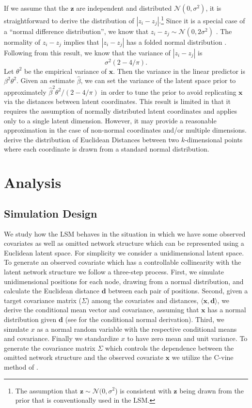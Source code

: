\documentclass[11pt]{article}
\begin{document}
If we assume that the $\mathbf{z}$ are independent and distributed $\mathcal{N}(0,\sigma^2)$, it is straightforward to derive the distribution of $|z_i - z_j|$.\footnote{The assumption that $\mathbf{z} \sim \mathcal{N}(0,\sigma^2$) is consistent with $\mathbf{z}$ being drawn from the prior that is conventionally used in the LSM.} Since it is a special case of a ``normal difference distribution'', we know that $z_i - z_j \sim \mathcal{N}(0,2\sigma^2)$ \citep{devore2012}. The normality of $z_i - z_j$ implies that $|z_i - z_j|$ has a folded normal distribution \citep{leone1961}. Following from this result, we know that the variance of  $|z_i - z_j|$ is $$\sigma^2(2-4/\pi). $$ Let $\theta^2$ be the empirical variance of $\mathbf{x}$. Then the variance in the linear predictor is $\beta^2\theta^2$. Given an estimate $\hat{\beta}$, we can set the variance of the latent space prior to approximately $\hat{\beta}^2\theta^2/(2-4/\pi)$ in order to tune the prior to avoid replicating $\mathbf{x}$ via the distances between latent coordinates. This result is limited in that it requires the assumption of normally distributed latent coordinates and applies only to a single latent dimension. However, it may provide a reasonable approximation in the case of non-normal coordinates and/or multiple dimensions. \cite{thirey2015} derive the distribution of Euclidean Distances between two $k$-dimensional points where each coordinate is drawn from a standard normal distribution.

\section{Analysis}

\subsection{Simulation Design}

We study how the LSM behaves in the situation in which we have some observed covariates as well as omitted network structure which can be represented using a Euclidean latent space. For simplicity we consider a unidimensional latent space. To generate an observed covariate which has a controllable collinearity with the latent network structure we follow a three-step process. First, we simulate unidimensional positions for each node, drawing from a normal distribution, and calculate the Euclidean distance $\mathbf{d}$ between each pair of positions. Second, given a target covariance matrix ($\Sigma$) among the covariates and distances, $\langle \mathbf{x}, \mathbf{d} \rangle$, we derive the conditional mean vector and covariance, assuming that $\mathbf{x}$ has a normal distribution given $\mathbf{d}$ (see \cite[pp. 116--117]{eaton1983} for the conditional normal derivation). Third, we simulate $x$ as a normal random variable with the respective conditional means and covariance. Finally we standardize $x$ to have zero mean and unit variance. To generate the covariance matrix $\Sigma$ which controls the dependence between the omitted network structure and the observed covariate $\mathbf{x}$ we utilize the C-vine method of \cite{lewandowski2009generating}. %
\end{document}
